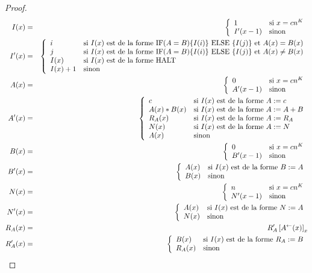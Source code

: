 \begin{appendices}
\begin{proof}
{\begin{minipage}{0.9\textwidth}
			 
					\begin{eqnarray}
					I(x) & = & \left\lbrace \begin{array}{ll} 
						1			& 	\text{si $x = c n^K$} \\
						I'(x-1)		& 	\text{sinon}
					 \end{array} \right. \\
					I'(x) & = & \left\lbrace \begin{array}{ll} 
						i			& 	\text{si $I(x)$ est de la forme $\text{IF} (A=B) \{I( i )\} \text{ ELSE } \{I( j )\}$ et $A(x) = B(x)$} \\
						j			& 	\text{si $I(x)$ est de la forme $\text{IF} (A=B) \{I( i )\} \text{ ELSE } \{I( j )\}$ et $A(x) \neq B(x)$} \\
						I(x)		&  	\text{si $I(x)$ est de la forme $\text{HALT}$} \\
						I(x) + 1 	& 	\text{sinon} 
					 \end{array} \right. \\
					A(x) & = & \left\lbrace \begin{array}{ll} 
						0			& 	\text{si $x = cn^K$} \\
						A'(x-1)		& 	\text{sinon}
					 \end{array} \right. \\
					A'(x) & = & \left\lbrace \begin{array}{ll} 
						c			& 	\text{si $I(x)$ est de la forme $A := c$} \\
						A(x) * B(x)	& 	\text{si $I(x)$ est de la forme $A := A + B$} \\
						R_A(x) 		& 	\text{si $I(x)$ est de la forme $A := R_A$} \\
						N(x)		& 	\text{si $I(x)$ est de la forme $A := N$} \\
						A(x)		& 	\text{sinon}
					 \end{array} \right. \\
					B(x) & = & \left\lbrace \begin{array}{ll} 
						0			& 	\text{si $x = cn^K$} \\
						B'(x-1)		& 	\text{sinon}
					 \end{array} \right. \\
					B'(x) & = & \left\lbrace \begin{array}{ll} 
						A(x)		& 	\text{si $I(x)$ est de la forme $B := A$} \\
						B(x)		& 	\text{sinon}
					 \end{array} \right. \\
					N(x) & = & \left\lbrace \begin{array}{ll} 
						n			& 	\text{si $x = cn^K$} \\
						N'(x-1)		& 	\text{sinon}
					 \end{array} \right. \\
					N'(x) & = & \left\lbrace \begin{array}{ll} 
						A(x)		& 	\text{si $I(x)$ est de la forme $N := A$} \\
						N(x)		& 	\text{sinon}
					 \end{array} \right. \\
					R_A(x) & = & R_A'\left[ A^{\leftarrow}(x) \right]_{x} \\
					R_A'(x) & = & \left\lbrace \begin{array}{ll} 
						B(x)		& 	\text{si $I(x)$ est de la forme $R_A := B$} \\
						R_A(x)		& 	\text{sinon}
					 \end{array} \right.
					\end{eqnarray}
					
				\end{minipage}
			}
			

\end{proof}
\end{appendices}
